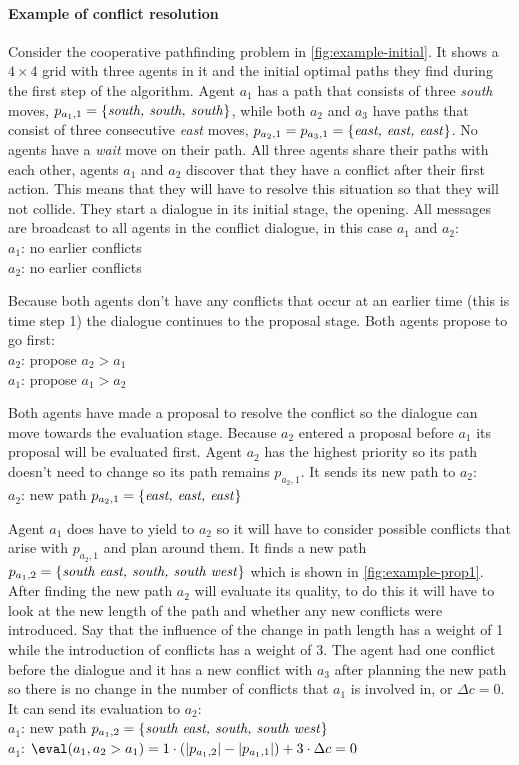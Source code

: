 \paragraph{Example of conflict resolution} Consider the cooperative pathfinding
problem in \autoref{fig:example-initial}. It shows a $4 \times 4$ grid with
three agents in it and the initial optimal paths they find during the first
step of the algorithm. Agent $a_1$ has a path that consists of three
\emph{south} moves, $p_{a_{1},1} = \{\text{\emph{south, south, south}}\}$,
while both $a_2$ and $a_3$ have paths that consist of three consecutive
\emph{east} moves, $p_{a_2,1} = p_{a_3,1} = \{\text{\emph{east, east,
east}}\}$. No agents have a \emph{wait} move on their path. All three
agents share their paths with each other, agents $a_1$ and $a_2$ discover that
they have a conflict after their first action. This means that they will have
to resolve this situation so that they will not collide. They start a dialogue
in its initial stage, the opening. All messages are broadcast to all agents in
the conflict dialogue, in this case $a_1$ and $a_2$:
\\ \-\qquad $a_1$: no earlier conflicts
\\ \-\qquad $a_2$: no earlier conflicts

Because both agents don't have any conflicts that occur at an earlier time
(this is time step 1) the dialogue continues to the proposal stage. Both agents
propose to go first:
\\ \-\qquad $a_2$: propose $a_2 > a_1$
\\ \-\qquad $a_1$: propose $a_1 > a_2$

Both agents have made a proposal to resolve the conflict so the dialogue can
move towards the evaluation stage. Because $a_2$ entered a proposal before
$a_1$ its proposal will be evaluated first. Agent $a_2$ has the highest
priority so its path doesn't need to change so its path remains $p_{a_2,1}$. It
sends its new path to $a_2$:
\\ \-\qquad $a_2$: new path $p_{a_2,1} = \{\text{\emph{east, east, east}}\}$

Agent $a_1$ does have to yield to $a_2$ so it will have to consider possible
conflicts that arise with $p_{a_2,1}$ and plan around them. It finds a new path
$p_{a_1,2} = \{\text{\emph{south east, south, south west}}\}$ which is shown in
\autoref{fig:example-prop1}. After finding the new path $a_2$ will evaluate its
quality, to do this it will have to look at the new length of the path and
whether any new conflicts were introduced. Say that the influence of the change
in path length has a weight of 1 while the introduction of conflicts has a
weight of 3. The agent had one conflict before the dialogue and it has a new
conflict with $a_3$ after planning the new path so there is no change in the
number of conflicts that $a_1$ is involved in, or $\Delta c = 0$. It can send
its evaluation to $a_2$:
\\ \-\qquad $a_1$: new path $p_{a_1,2} = \{\text{\emph{south east, south,
south west}}\}$
\\ \-\qquad $a_1$: $\eval(a_1, a_2 > a_1) = 1 \cdot (|p_{a_1,2}| - |p_{a_1,1}|)
+ 3
\cdot \Delta c = 0$

